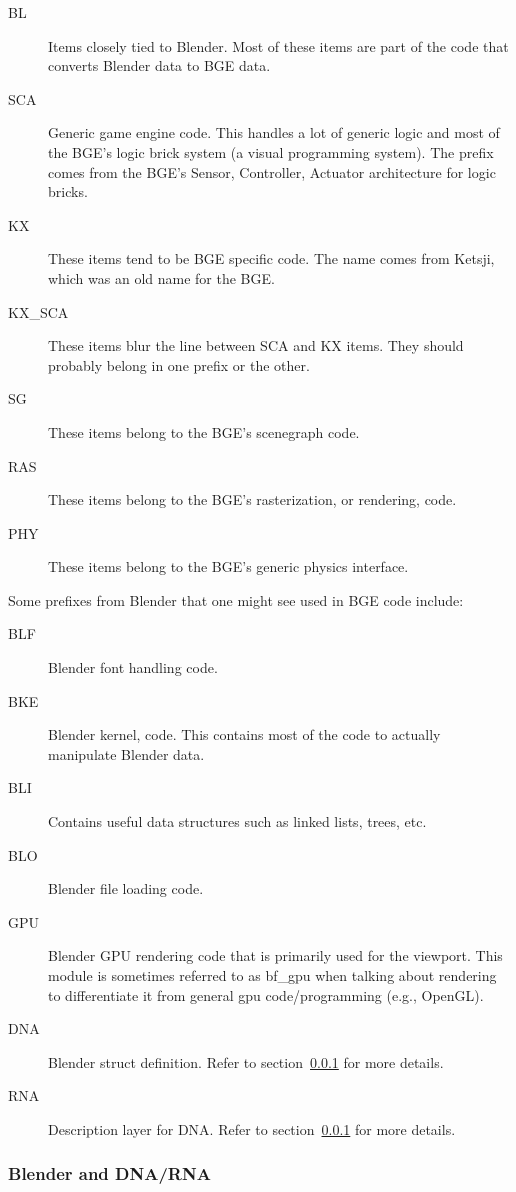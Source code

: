 \begin{description}
 \item[BL] Items closely tied to Blender. Most of these items are part of the code that converts Blender data to BGE data.
 \item[SCA] Generic game engine code. This handles a lot of generic logic and most of the BGE's logic brick system (a visual programming system). The prefix comes from the BGE's Sensor, Controller, Actuator architecture for logic bricks.
 \item [KX] These items tend to be BGE specific code. The name comes from Ketsji, which was an old name for the BGE.
 \item [KX\_SCA] These items blur the line between SCA and KX items. They should probably belong in one prefix or the other.
 \item [SG] These items belong to the BGE's scenegraph code.
 \item [RAS] These items belong to the BGE's rasterization, or rendering, code.
 \item [PHY] These items belong to the BGE's generic physics interface.
\end{description}

Some prefixes from Blender that one might see used in BGE code include:

\begin{description}
 \item [BLF] Blender font handling code.
 \item [BKE] Blender kernel, code. This contains most of the code to actually manipulate Blender data.
 \item [BLI] Contains useful data structures such as linked lists, trees, etc.
 \item [BLO] Blender file loading code.
 \item [GPU] Blender GPU rendering code that is primarily used for the viewport. This module is sometimes referred to as bf\_gpu when talking about rendering to differentiate it from general gpu code/programming (e.g., OpenGL).
 \item [DNA] Blender struct definition. Refer to section~\ref{sec:bf_dna_rna} for more details.
 \item [RNA] Description layer for DNA. Refer to section~\ref{sec:bf_dna_rna} for more details.
\end{description}

\subsubsection{Blender and DNA/RNA}
\label{sec:bf_dna_rna}

